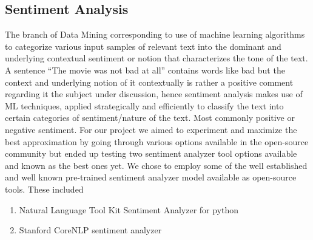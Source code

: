 \documentclass[sigconf, nonacm]{acmart}
\begin{document}
\subsection{Sentiment Analysis} 
The branch of Data Mining corresponding to use of machine learning algorithms to categorize various input samples of relevant text into the dominant and underlying contextual sentiment or notion that characterizes the tone of the text. A sentence “The movie was not bad at all” contains words like bad but the context and underlying notion of it contextually is rather a positive comment regarding it the subject under discussion, hence sentiment analysis makes use of ML techniques, applied strategically and efficiently to classify the text into certain categories of sentiment/nature of the text. Most commonly positive or negative sentiment.
For our project we aimed to experiment and maximize the best approximation by going through various options available in the open-source community but ended up testing two sentiment analyzer tool options available and known as the best ones yet. We chose to employ some of the well established and well known pre-trained sentiment analyzer model available as open-source tools. These included
\begin{enumerate}
    \item Natural Language Tool Kit Sentiment Analyzer for python
    \item Stanford CoreNLP sentiment analyzer
\end{enumerate}
\end{document}
